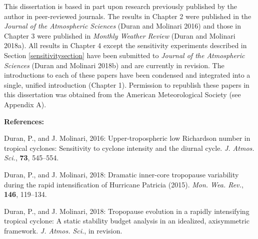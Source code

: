  


\indent \indent This dissertation is based in part upon research previously published by the author in peer-reviewed journals.
The results in Chapter 2 were published in the \textit{Journal of the Atmospheric Sciences} (Duran and Molinari 2016) and those in Chapter 3 were published in \textit{Monthly Weather Review} (Duran and Molinari 2018a).
All results in Chapter 4 except the sensitivity experiments described in Section \ref{sensitivitysection} have been submitted to \textit{Journal of the Atmospheric Sciences} (Duran and Molinari 2018b) and are currently in revision.
The introductions to each of these papers have been condensed and integrated into a single, unified introduction (Chapter 1).
Permission to republish these papers in this dissertation was obtained from the American Meteorological Society (see Appendix A).

\vspace{10mm}

\noindent \textbf{References:}

\noindent Duran, P., and J. Molinari, 2016: Upper-tropospheric low Richardson number in tropical cyclones: Sensitivity to cyclone intensity and the diurnal cycle. \textit{J. Atmos. Sci.}, \textbf{73}, 545--554.

\noindent Duran, P., and J. Molinari, 2018: Dramatic inner-core tropopause variability during the rapid intensification of Hurricane Patricia (2015). \textit{Mon. Wea. Rev.}, \textbf{146}, 119--134.

\noindent Duran, P., and J. Molinari, 2018: Tropopause evolution in a rapidly intensifying tropical cyclone: A static stability budget analysis in an idealized, axisymmetric framework. \textit{J. Atmos. Sci.}, in revision.
